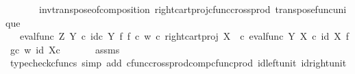 \begin{isabellebody}
\ \ \ \ \ \ \ inv{\isacharunderscore}{\kern0pt}transpose{\isacharunderscore}{\kern0pt}of{\isacharunderscore}{\kern0pt}composition\ right{\isacharunderscore}{\kern0pt}cart{\isacharunderscore}{\kern0pt}proj{\isacharunderscore}{\kern0pt}cfunc{\isacharunderscore}{\kern0pt}cross{\isacharunderscore}{\kern0pt}prod\ transpose{\isacharunderscore}{\kern0pt}func{\isacharunderscore}{\kern0pt}unique{\isacharparenright}{\kern0pt}\isanewline
\ \ \isamarkupfalse%
\isanewline
\ \ \isamarkupfalse%
\ \isamarkupfalse%
\ {\isachardoublequoteopen}{\isachardot}{\kern0pt}{\isachardot}{\kern0pt}{\isachardot}{\kern0pt}\ {\isacharequal}{\kern0pt}\ {\isacharparenleft}{\kern0pt}eval{\isacharunderscore}{\kern0pt}func\ Z\ Y\ {\isasymcirc}\isactrlsub c\ {\isacharparenleft}{\kern0pt}id\isactrlsub c\ Y\ {\isasymtimes}\isactrlsub f\ {\isacharparenleft}{\kern0pt}{\isacharparenleft}{\kern0pt}f\ {\isasymcirc}\isactrlsub c\ w{\isacharparenright}{\kern0pt}\ {\isasymcirc}\isactrlsub c\ right{\isacharunderscore}{\kern0pt}cart{\isacharunderscore}{\kern0pt}proj\ X\ {\isasymone}{\isacharparenright}{\kern0pt}{\isacharparenright}{\kern0pt}\ {\isasymcirc}\isactrlsub c\ {\isasymlangle}eval{\isacharunderscore}{\kern0pt}func\ Y\ X\ {\isasymcirc}\isactrlsub c\ {\isacharparenleft}{\kern0pt}id\ X\ {\isasymtimes}\isactrlsub f\ {\isacharparenleft}{\kern0pt}g{\isasymcirc}\isactrlsub c\ w{\isacharparenright}{\kern0pt}{\isacharparenright}{\kern0pt}{\isacharcomma}{\kern0pt}\ id\ {\isacharparenleft}{\kern0pt}X{\isasymtimes}\isactrlsub c\ {\isasymone}{\isacharparenright}{\kern0pt}{\isasymrangle}{\isacharparenright}{\kern0pt}\isactrlsup {\isasymsharp}{\isachardoublequoteclose}\isanewline
\ \ \ \ \isamarkupfalse%
\ assms\ \isamarkupfalse%
\ {\isacharparenleft}{\kern0pt}typecheck{\isacharunderscore}{\kern0pt}cfuncs{\isacharcomma}{\kern0pt}\ simp\ add{\isacharcolon}{\kern0pt}\ cfunc{\isacharunderscore}{\kern0pt}cross{\isacharunderscore}{\kern0pt}prod{\isacharunderscore}{\kern0pt}comp{\isacharunderscore}{\kern0pt}cfunc{\isacharunderscore}{\kern0pt}prod\ id{\isacharunderscore}{\kern0pt}left{\isacharunderscore}{\kern0pt}unit{}\ id{\isacharunderscore}{\kern0pt}right{\isacharunderscore}{\kern0pt}unit{}{\isacharparenright}{\kern0pt}\isanewline
\ \ \isamarkupfalse%
\ \isamarkupfalse%

\end{isabellebody}
